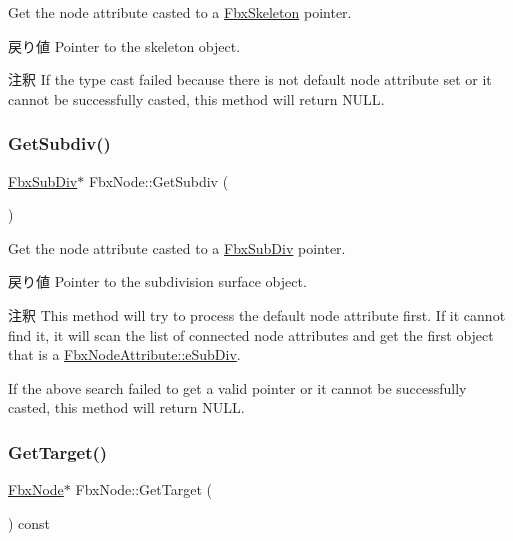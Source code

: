 Get the node attribute casted to a \hyperlink{class_fbx_skeleton}{Fbx\+Skeleton} pointer. \begin{DoxyReturn}{戻り値}
Pointer to the skeleton object. 
\end{DoxyReturn}
\begin{DoxyRemark}{注釈}
If the type cast failed because there is not default node attribute set or it cannot be successfully casted, this method will return {\ttfamily N\+U\+LL}. 
\end{DoxyRemark}
\mbox{\label{class_fbx_node_aaa4046b59bfd467d72e607a56b2d41c1}} 
\subsubsection{\texorpdfstring{Get\+Subdiv()}{GetSubdiv()}}
{\footnotesize\ttfamily \hyperlink{class_fbx_sub_div}{Fbx\+Sub\+Div}$\ast$ Fbx\+Node\+::\+Get\+Subdiv (\begin{DoxyParamCaption}{ }\end{DoxyParamCaption})}

Get the node attribute casted to a \hyperlink{class_fbx_sub_div}{Fbx\+Sub\+Div} pointer. \begin{DoxyReturn}{戻り値}
Pointer to the subdivision surface object. 
\end{DoxyReturn}
\begin{DoxyRemark}{注釈}
This method will try to process the default node attribute first. If it cannot find it, it will scan the list of connected node attributes and get the first object that is a \hyperlink{class_fbx_node_attribute_a08e1669d3d1a696910756ab17de56d6aabf6eece53604664abed75e7fb2720832}{Fbx\+Node\+Attribute\+::e\+Sub\+Div}. 

If the above search failed to get a valid pointer or it cannot be successfully casted, this method will return {\ttfamily N\+U\+LL}. 
\end{DoxyRemark}
\mbox{\label{class_fbx_node_a27c131db236dfa152db38b6027b9f7ec}} 
\subsubsection{\texorpdfstring{Get\+Target()}{GetTarget()}}
{\footnotesize\ttfamily \hyperlink{class_fbx_node}{Fbx\+Node}$\ast$ Fbx\+Node\+::\+Get\+Target (\begin{DoxyParamCaption}{ }\end{DoxyParamCaption}) const}

